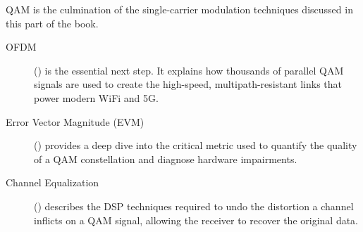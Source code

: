 \begin{importantbox}[title={Further Reading}]
    QAM is the culmination of the single-carrier modulation techniques discussed in this part of the book.
    \begin{description}
        \item[OFDM] () is the essential next step. It explains how thousands of parallel QAM signals are used to create the high-speed, multipath-resistant links that power modern WiFi and 5G.
        \item[Error Vector Magnitude (EVM)] () provides a deep dive into the critical metric used to quantify the quality of a QAM constellation and diagnose hardware impairments.
        \item[Channel Equalization] () describes the DSP techniques required to undo the distortion a channel inflicts on a QAM signal, allowing the receiver to recover the original data.
    \end{description}
\end{importantbox}